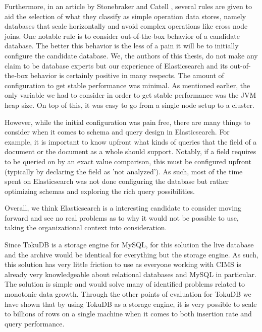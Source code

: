 Furthermore, in an article by Stonebraker and Catell \cite{10rules}, several rules are given to aid the selection of what they classify as simple operation data stores, namely databases that scale horizontally and avoid complex operations like cross node joins. One notable rule is to consider out-of-the-box behavior of a candidate database. The better this behavior is the less of a pain it will be to initially configure the candidate database. We, the authors of this thesis, do not make any claim to be database experts but our experience of Elasticsearch and its out-of-the-box behavior is certainly positive in many respects. The amount of configuration to get stable performance was minimal. As mentioned earlier, the only variable we had to consider in order to get stable performance was the JVM heap size. On top of this, it was easy to go from a single node setup to a cluster. 

However, while the initial configuration was pain free, there are many things to consider when it comes to schema and query design in Elasticsearch. For example, it is important to know upfront what kinds of queries that the field of a document or the document as a whole should support. Notably, if a field requires to be queried on by an exact value comparison, this must be configured upfront (typically by declaring the field as 'not analyzed'). As such, most of the time spent on Elasticsearch was not done configuring the database but rather optimizing schemas and exploring the rich query possibilities.

Overall, we think Elasticsearch is a interesting candidate to consider moving forward and see no real problems as to why it would not be possible to use, taking the organizational context into consideration.

Since TokuDB is a storage engine for MySQL, for this solution the live database and the archive would be identical for everything but the storage engine. As such, this solution has very little friction to use as everyone working with CIMS is already very knowledgeable about relational databases and MySQL in particular. The solution is simple and would solve many of identified problems related to monotonic data growth. Through the other points of evaluation for TokuDB we have shown that by using TokuDB as a storage engine, it is very possible to scale to billions of rows on a single machine when it comes to both insertion rate and query performance.